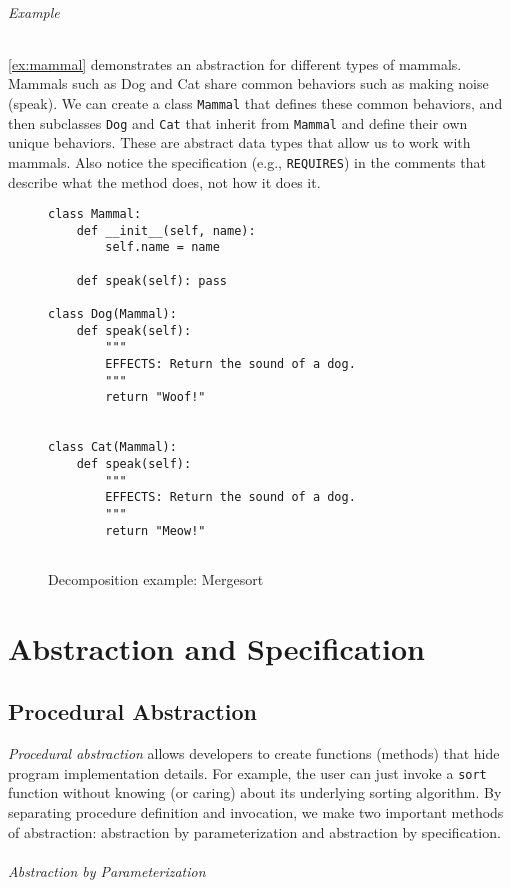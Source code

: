 \documentclass[oneside,11pt,dvipsnames]{book}
\newcommand{\code}[1]{\texttt{#1}}
\begin{document}
\paragraph{Example} \autoref{ex:mammal} demonstrates an abstraction for different types of mammals. Mammals such as Dog and Cat share common behaviors such as making noise (speak). We can create a class \code{Mammal} that defines these common behaviors, and then subclasses \code{Dog} and \code{Cat} that inherit from \code{Mammal} and define their own unique behaviors.  These are abstract data types that allow us to work with mammals. Also notice the specification (e.g., \code{REQUIRES}) in the comments that describe what the method does, not how it does it.

\begin{figure}[t]
\begin{lstlisting}[multicols=2]
class Mammal:
    def __init__(self, name):
        self.name = name

    def speak(self): pass

class Dog(Mammal):
    def speak(self): 
        """
        EFFECTS: Return the sound of a dog.
        """
        return "Woof!"


class Cat(Mammal):
    def speak(self):
        """
        EFFECTS: Return the sound of a dog.
        """
        return "Meow!"
    

\end{lstlisting}
 \caption{Decomposition example: Mergesort}\label{ex:mammal}
\end{figure}

\part{Abstraction and Specification}
\chapter{Procedural Abstraction}\label{chap:procedural-abstraction}

\emph{Procedural abstraction} allows developers to create functions (methods) that hide program implementation details. For example, the user can just invoke a \code{sort} function without knowing (or caring) about its underlying sorting algorithm. 
By separating procedure definition and invocation, we make two important methods of abstraction: abstraction by parameterization and abstraction by specification.

\paragraph{Abstraction by Parameterization}
\end{document}
